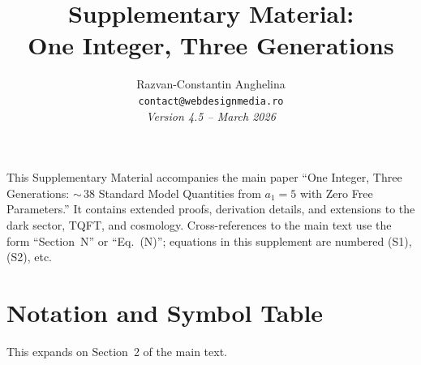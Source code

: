 \documentclass[12pt,a4paper]{article}
\title{\textbf{Supplementary Material:\\
One Integer, Three Generations}}
\author{
Razvan-Constantin Anghelina\\
\texttt{contact@webdesignmedia.ro}\\[1em]
\textit{Version 4.5 -- March 2026}
}
\date{}
\theoremstyle{definition}
\begin{document}
\maketitle

\noindent This Supplementary Material accompanies the main paper ``One Integer, Three Generations: ${\sim}\,38$ Standard Model Quantities from $a_1 = 5$ with Zero Free Parameters.''  It contains extended proofs, derivation details, and extensions to the dark sector, TQFT, and cosmology.  Cross-references to the main text use the form ``Section~N'' or ``Eq.~(N)''; equations in this supplement are numbered (S1), (S2), etc.

\tableofcontents
\newpage

\section{Notation and Symbol Table}
\label{sec:S-notation}

This expands on Section~2 of the main text.
\end{document}
